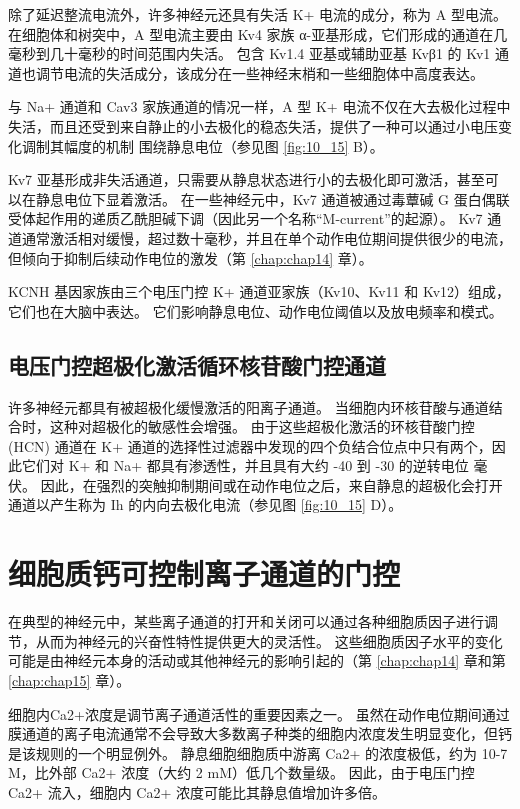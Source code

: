 除了延迟整流电流外，许多神经元还具有失活 K+ 电流的成分，称为 A 型电流。 
在细胞体和树突中，A 型电流主要由 Kv4 家族 α-亚基形成，它们形成的通道在几毫秒到几十毫秒的时间范围内失活。 
包含 Kv1.4 亚基或辅助亚基 Kvβ1 的 Kv1 通道也调节电流的失活成分，该成分在一些神经末梢和一些细胞体中高度表达。


与 Na+ 通道和 Cav3 家族通道的情况一样，A 型 K+ 电流不仅在大去极化过程中失活，而且还受到来自静止的小去极化的稳态失活，提供了一种可以通过小电压变化调制其幅度的机制 围绕静息电位（参见图 \ref{fig:10_15} B）。

Kv7 亚基形成非失活通道，只需要从静息状态进行小的去极化即可激活，甚至可以在静息电位下显着激活。 
在一些神经元中，Kv7 通道被通过毒蕈碱 G 蛋白偶联受体起作用的递质乙酰胆碱下调（因此另一个名称“M-current”的起源）。 
Kv7 通道通常激活相对缓慢，超过数十毫秒，并且在单个动作电位期间提供很少的电流，但倾向于抑制后续动作电位的激发（第 \ref{chap:chap14} 章）。

KCNH 基因家族由三个电压门控 K+ 通道亚家族（Kv10、Kv11 和 Kv12）组成，它们也在大脑中表达。 
它们影响静息电位、动作电位阈值以及放电频率和模式。


\subsection{电压门控超极化激活循环核苷酸门控通道}
许多神经元都具有被超极化缓慢激活的阳离子通道。 
当细胞内环核苷酸与通道结合时，这种对超极化的敏感性会增强。 
由于这些超极化激活的环核苷酸门控 (HCN) 通道在 K+ 通道的选择性过滤器中发现的四个负结合位点中只有两个，因此它们对 K+ 和 Na+ 都具有渗透性，并且具有大约 -40 到 -30 的逆转电位 毫伏。 
因此，在强烈的突触抑制期间或在动作电位之后，来自静息的超极化会打开通道以产生称为 Ih 的内向去极化电流（参见图 \ref{fig:10_15} D）。


\section{细胞质钙可控制离子通道的门控}
在典型的神经元中，某些离子通道的打开和关闭可以通过各种细胞质因子进行调节，从而为神经元的兴奋性特性提供更大的灵活性。 
这些细胞质因子水平的变化可能是由神经元本身的活动或其他神经元的影响引起的（第 \ref{chap:chap14} 章和第 \ref{chap:chap15} 章）。


细胞内Ca2+浓度是调节离子通道活性的重要因素之一。 
虽然在动作电位期间通过膜通道的离子电流通常不会导致大多数离子种类的细胞内浓度发生明显变化，但钙是该规则的一个明显例外。 
静息细胞细胞质中游离 Ca2+ 的浓度极低，约为 10-7 M，比外部 Ca2+ 浓度（大约 2 mM）低几个数量级。 
因此，由于电压门控 Ca2+ 流入，细胞内 Ca2+ 浓度可能比其静息值增加许多倍。


